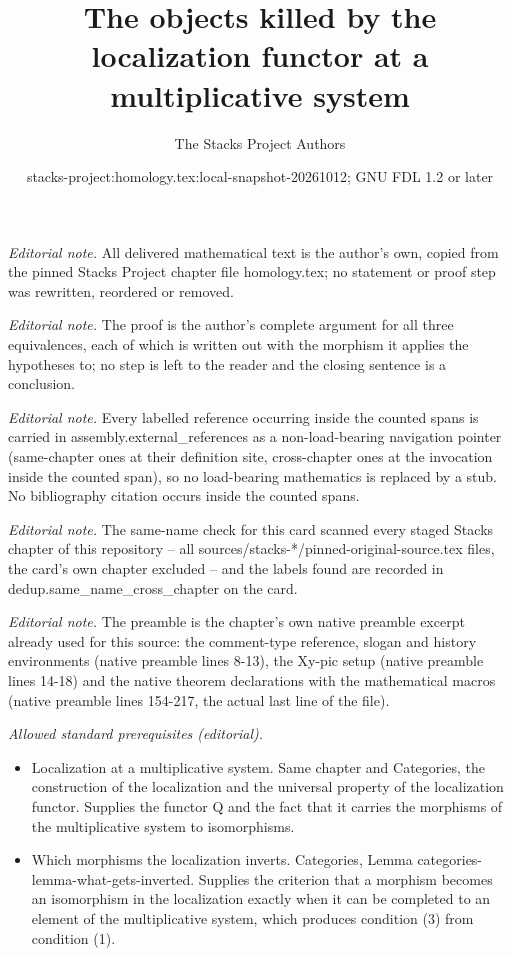 \documentclass[10pt,a4paper]{amsart}
\title{The objects killed by the localization functor at a multiplicative system}
\author{The Stacks Project Authors}
\date{stacks-project:homology.tex:local-snapshot-20261012; GNU FDL 1.2 or later}
\theoremstyle{plain}
\theoremstyle{definition}
\theoremstyle{remark}
\numberwithin{equation}{subsection}
\begin{document}
\maketitle
\noindent\textit{Editorial note.} All delivered mathematical text is the author's own, copied from the pinned Stacks Project chapter file homology.tex; no statement or proof step was rewritten, reordered or removed.\par\medskip
\noindent\textit{Editorial note.} The proof is the author's complete argument for all three equivalences, each of which is written out with the morphism it applies the hypotheses to; no step is left to the reader and the closing sentence is a conclusion.\par\medskip
\noindent\textit{Editorial note.} Every labelled reference occurring inside the counted spans is carried in assembly.external\_references as a non-load-bearing navigation pointer (same-chapter ones at their definition site, cross-chapter ones at the invocation inside the counted span), so no load-bearing mathematics is replaced by a stub. No bibliography citation occurs inside the counted spans.\par\medskip
\noindent\textit{Editorial note.} The same-name check for this card scanned every staged Stacks chapter of this repository -- all sources/stacks-*/pinned-original-source.tex files, the card's own chapter excluded -- and the labels found are recorded in dedup.same\_name\_cross\_chapter on the card.\par\medskip
\noindent\textit{Editorial note.} The preamble is the chapter's own native preamble excerpt already used for this source: the comment-type reference, slogan and history environments (native preamble lines 8-13), the Xy-pic setup (native preamble lines 14-18) and the native theorem declarations with the mathematical macros (native preamble lines 154-217, the actual last line of the file).\par\medskip
\noindent\textit{Allowed standard prerequisites (editorial).}\begin{itemize}
\item Localization at a multiplicative system. Same chapter and Categories, the construction of the localization and the universal property of the localization functor. Supplies the functor Q and the fact that it carries the morphisms of the multiplicative system to isomorphisms.
\item Which morphisms the localization inverts. Categories, Lemma categories-lemma-what-gets-inverted. Supplies the criterion that a morphism becomes an isomorphism in the localization exactly when it can be completed to an element of the multiplicative system, which produces condition (3) from condition (1).
\end{itemize}\medskip
\end{document}
